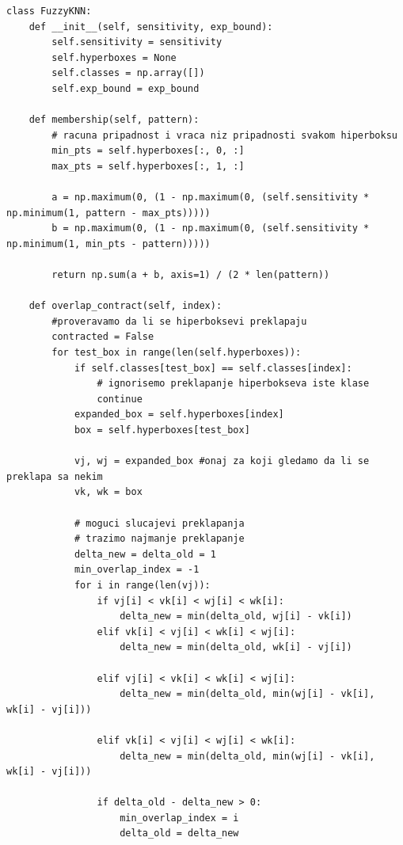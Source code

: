 \documentclass[a4paper]{article}
\begin{document}
\begin{lstlisting}[caption={Klasa koja predstavlja Fazi Min Max klasifikator koji koristi KNN},frame=single, label=particle]
class FuzzyKNN:
    def __init__(self, sensitivity, exp_bound):
        self.sensitivity = sensitivity
        self.hyperboxes = None
        self.classes = np.array([])
        self.exp_bound = exp_bound
        
    def membership(self, pattern):
        # racuna pripadnost i vraca niz pripadnosti svakom hiperboksu
        min_pts = self.hyperboxes[:, 0, :]
        max_pts = self.hyperboxes[:, 1, :]

        a = np.maximum(0, (1 - np.maximum(0, (self.sensitivity * np.minimum(1, pattern - max_pts)))))
        b = np.maximum(0, (1 - np.maximum(0, (self.sensitivity * np.minimum(1, min_pts - pattern)))))
        
        return np.sum(a + b, axis=1) / (2 * len(pattern))
    
    def overlap_contract(self, index):
        #proveravamo da li se hiperboksevi preklapaju
        contracted = False
        for test_box in range(len(self.hyperboxes)):
            if self.classes[test_box] == self.classes[index]:
                # ignorisemo preklapanje hiperbokseva iste klase
                continue
            expanded_box = self.hyperboxes[index]
            box = self.hyperboxes[test_box]
            
            vj, wj = expanded_box #onaj za koji gledamo da li se preklapa sa nekim
            vk, wk = box

            # moguci slucajevi preklapanja
            # trazimo najmanje preklapanje
            delta_new = delta_old = 1
            min_overlap_index = -1
            for i in range(len(vj)):
                if vj[i] < vk[i] < wj[i] < wk[i]:
                    delta_new = min(delta_old, wj[i] - vk[i])
                elif vk[i] < vj[i] < wk[i] < wj[i]:
                    delta_new = min(delta_old, wk[i] - vj[i])
                
                elif vj[i] < vk[i] < wk[i] < wj[i]:
                    delta_new = min(delta_old, min(wj[i] - vk[i], wk[i] - vj[i]))

                elif vk[i] < vj[i] < wj[i] < wk[i]:
                    delta_new = min(delta_old, min(wj[i] - vk[i], wk[i] - vj[i]))

                if delta_old - delta_new > 0:
                    min_overlap_index = i
                    delta_old = delta_new


\end{lstlisting}
\end{document}
